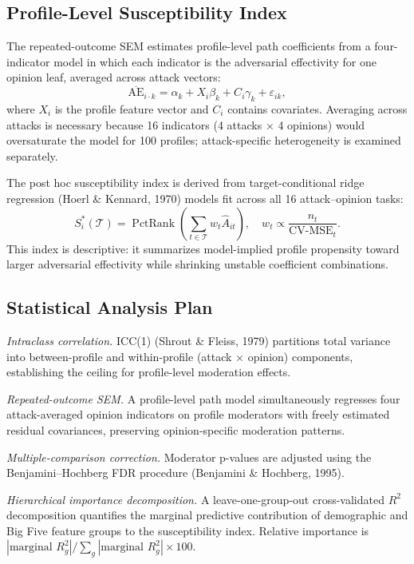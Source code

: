 \documentclass[11pt]{article}
\begin{document}
\subsection{Profile-Level Susceptibility Index}
The repeated-outcome SEM estimates profile-level path coefficients from a four-indicator model in which each indicator is the adversarial effectivity for one opinion leaf, averaged across attack vectors:
\begin{equation}
\overline{\mathrm{AE}}_{i \cdot k} = \alpha_k + X_i\beta_k + C_i\gamma_k + \varepsilon_{ik},
\end{equation}
where $X_i$ is the profile feature vector and $C_i$ contains covariates.
Averaging across attacks is necessary because 16 indicators (4 attacks $\times$ 4 opinions) would oversaturate the model for 100 profiles; attack-specific heterogeneity is examined separately.

The post hoc susceptibility index is derived from target-conditional ridge regression (Hoerl \& Kennard, 1970) models fit across all 16 attack--opinion tasks:
\begin{equation}
S_i^*(\mathcal{T}) = \operatorname{PctRank}\!\left(\sum_{t \in \mathcal{T}} w_t \hat{A}_{it}\right),
\quad w_t \propto \frac{n_t}{\operatorname{CV\text{-}MSE}_t}.
\end{equation}
This index is descriptive: it summarizes model-implied profile propensity toward larger adversarial effectivity while shrinking unstable coefficient combinations.

\subsection{Statistical Analysis Plan}
\textit{Intraclass correlation.}
ICC(1) (Shrout \& Fleiss, 1979) partitions total variance into between-profile and within-profile (attack $\times$ opinion) components, establishing the ceiling for profile-level moderation effects.

\textit{Repeated-outcome SEM.}
A profile-level path model simultaneously regresses four attack-averaged opinion indicators on profile moderators with freely estimated residual covariances, preserving opinion-specific moderation patterns.

\textit{Multiple-comparison correction.}
Moderator p-values are adjusted using the Benjamini--Hochberg FDR procedure (Benjamini \& Hochberg, 1995).

\textit{Hierarchical importance decomposition.}
A leave-one-group-out cross-validated $R^2$ decomposition quantifies the marginal predictive contribution of demographic and Big Five feature groups to the susceptibility index.
Relative importance is $|\text{marginal } R^2_g| / \sum_g |\text{marginal } R^2_g| \times 100$.
\end{document}
